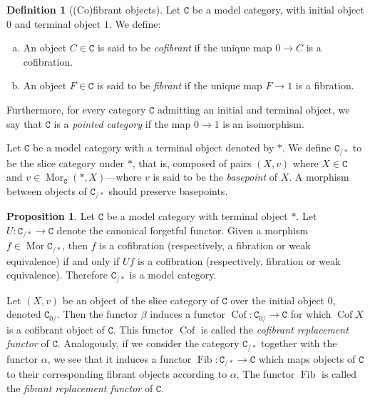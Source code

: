 \documentclass[11pt, reqno]{amsart}
\theoremstyle{definition}
\newtheorem{proposition}[theorem]{Proposition}
\newtheorem{definition}[theorem]{Definition}
\newcommand{\cat}{\texttt}
\DeclareMathOperator{\Mor}{Mor}   %
\DeclareMathOperator{\Cof}{Cof} %
\DeclareMathOperator{\Fib}{Fib} %
\begin{document}
\begin{definition}[(Co)fibrant objects]
\label{def:(co)fibrant-objects}
Let \(\cat C\) be a model category, with initial object \(0\) and terminal
object \(1\). We define:
\begin{enumerate}[(a)]\setlength\itemsep{0em}
\item An object \(C \in \cat C\) is said to be \emph{cofibrant} if the unique map
  \(0 \to C\) is a cofibration.

\item An object \(F \in \cat C\) is said to be \emph{fibrant} if the unique map
  \(F \to 1\) is a fibration.
\end{enumerate}
\end{definition}

Furthermore, for every category \(\cat C\) admitting an initial and terminal
object, we say that \(\cat C\) is a \emph{pointed category} if the map \(0 \to 1\)
is an isomorphism.

Let \(\cat C\) be a model category with a terminal object denoted by \(*\). We
define \(\cat C_{/*}\) to be the slice category under \(*\), that is, composed of
pairs \((X, v)\) where \(X \in \cat C\) and \(v \in \Mor_{\cat C}(*, X)\)---where
\(v\) is said to be the \emph{basepoint} of \(X\). A morphism between objects of
\(\cat C_{/*}\) should preserve basepoints.

\begin{proposition}
\label{prop:slice-over-terminal-is-model-cat}
Let \(\cat C\) be a model category with terminal object \(*\). Let
\(U: \cat C_{/*} \to \cat C\) denote the canonical forgetful functor. Given a
morphism \(f \in \Mor \cat C_{/*}\), then \(f\) is a cofibration (respectively, a
fibration or weak equivalence) if and only if \(U f\) is a cofibration
(respectively, fibration or weak equivalence). Therefore \(\cat C_{/*}\) is a
model category.
\end{proposition}

Let \((X, v)\) be an object of the slice category of \(\cat C\) over the initial
object \(0\), denoted \(\cat C_{0/}\). Then the functor \(\beta\) induces a functor
\(\Cof: \cat C_{0/} \to \cat C\) for which \(\Cof X\) is a cofibrant object of
\(\cat C\). This functor \(\Cof\) is called the \emph{cofibrant replacement
  functor} of \(\cat C\). Analogously, if we consider the category
\(\cat C_{/*}\) together with the functor \(\alpha\), we see that it induces a
functor \(\Fib: \cat C_{/*} \to \cat C\) which maps objects of \(\cat C\) to their
corresponding fibrant objects according to \(\alpha\). The functor \(\Fib\) is called
the \emph{fibrant replacement functor} of \(\cat C\).
\end{document}
